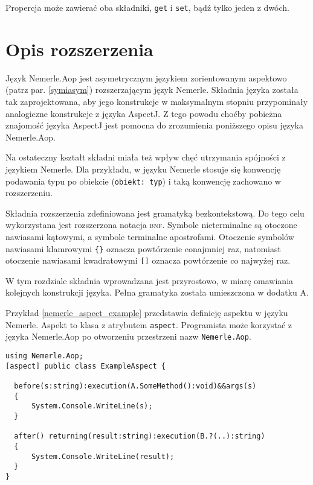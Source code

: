 \documentclass[a4paper,12pt]{mwbk}
\begin{document}
Propercja może zawierać oba
składniki, \lstinline!get! i \lstinline!set!, bądź tylko jeden z dwóch.










\chapter{Opis rozszerzenia}

Język Nemerle.Aop jest asymetrycznym językiem zorientowanym aspektowo (patrz
par. \ref{symiasym}) rozszerzającym język Nemerle. Składnia języka została tak
zaprojektowana, aby jego konstrukcje w maksymalnym stopniu przypominały
analogiczne konstrukcje z języka AspectJ. Z tego powodu choćby pobieżna
znajomość języka AspectJ jest pomocna do zrozumienia poniższego opisu języka
Nemerle.Aop. 

Na ostateczny kształt składni miała też wpływ chęć utrzymania spójności z
językiem Nemerle. Dla przykładu, w języku Nemerle stosuje się konwencję
podawania typu po obiekcie (\lstinline!obiekt: typ!) i taką konwencję zachowano
w rozszerzeniu.

Składnia rozszerzenia zdefiniowana jest gramatyką bezkontekstową. Do tego celu
wykorzystana jest rozszerzona notacja \textsc{bnf}. Symbole nieterminalne są
otoczone nawiasami kątowymi, a symbole terminalne apostrofami. Otoczenie
symbolów nawiasami klamrowymi \lstinline!{}! oznacza powtórzenie conajmniej
raz, natomiast otoczenie nawiasami kwadratowymi \lstinline![]! oznacza
powtórzenie co najwyżej raz.

W tym rozdziale składnia wprowadzana jest przyrostowo, w miarę omawiania
kolejnych konstrukcji języka. Pełna gramatyka została umieszczona w 
dodatku A.

Przykład \ref{nemerle_aspect_example} przedstawia definicję aspektu w języku
Nemerle. Aspekt to klasa z atrybutem \lstinline!aspect!. Programista może
korzystać z języka Nemerle.Aop po otworzeniu przestrzeni nazw
\lstinline!Nemerle.Aop!.

\begin{lstlisting}[style=AspectJ,caption=Przykład aspektu w języku Nemerle,label=nemerle_aspect_example]
using Nemerle.Aop;
[aspect] public class ExampleAspect {

  before(s:string):execution(A.SomeMethod():void)&&args(s) 
  {
      System.Console.WriteLine(s);
  }

  after() returning(result:string):execution(B.?(..):string) 
  {
      System.Console.WriteLine(result);
  }
}
\end{lstlisting}
\end{document}
